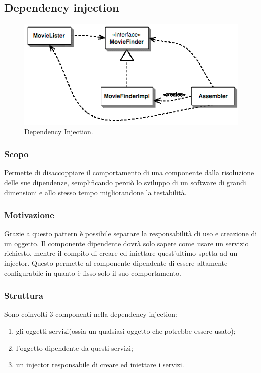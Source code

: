 
\subsection{Dependency injection}

\begin{figure}[H] \label{fig:injector}
	\includegraphics[scale=0.8]{img/injector.png}
	\caption{Dependency Injection.}
\end{figure}

\subsubsection{Scopo} Permette di disaccoppiare il comportamento di una componente dalla risoluzione delle sue dipendenze, semplificando perciò lo sviluppo di un software di grandi dimensioni e allo stesso tempo migliorandone la testabilità.

\subsubsection{Motivazione} Grazie a questo pattern è possibile separare la responsabilità di uso e creazione di un oggetto. Il componente dipendente dovrà solo sapere come usare un servizio richiesto, mentre il compito di creare ed iniettare quest'ultimo spetta ad un injector. Questo permette al componente dipendente di essere altamente configurabile in quanto è fisso solo il suo comportamento.

\subsubsection{Struttura} Sono coinvolti 3 componenti nella dependency injection:
\begin{enumerate}
	\item gli oggetti servizi(ossia un qualsiasi oggetto che potrebbe essere usato);
	\item l'oggetto dipendente da questi servizi;
	\item un injector responsabile di creare ed iniettare i servizi.
\end{enumerate}

